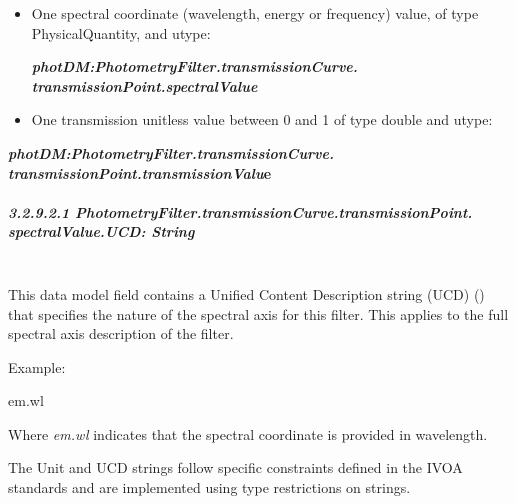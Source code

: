 \documentclass[11pt,a4paper]{ivoa}
\begin{document}
\begin{itemize}
	\item One spectral coordinate (wavelength, energy or frequency) value, of type 
	PhysicalQuantity, and utype:\par

\begin{center}
{\fontsize{10pt}{12.0pt}\selectfont 
\textbf{\textit{photDM:PhotometryFilter.transmissionCurve.
transmissionPoint.spectralValue}}\par}
\end{center}\par

	\item One transmission unitless value between 0 and 1 of type double and 
	utype:{\fontsize{11pt}{13.2pt}\selectfont \textit{ }\par}
\end{itemize}\par

\begin{center}
{\fontsize{10pt}{12.0pt}\selectfont \textbf{\textit{photDM:PhotometryFilter.transmissionCurve.
transmissionPoint.transmissionValu}e}\par}
\end{center}\par

\subparagraph{3.2.9.2.1
PhotometryFilter.transmissionCurve.transmissionPoint.
spectralValue.UCD: String} \hspace{0pt} \\
This data model field contains a Unified Content Description string (UCD) 
(\citep{2007ivoa.spec.0402M}) that specifies the nature of the spectral axis for this filter. 
This applies to the full spectral axis description of the filter.
\par

Example:
\par



em.wl

Where \textit{em.wl }indicates that the spectral coordinate is provided in wavelength.
\par

The Unit and UCD strings follow specific constraints defined in the IVOA standards and are 
implemented using type restrictions on strings.
\par
\end{document}
